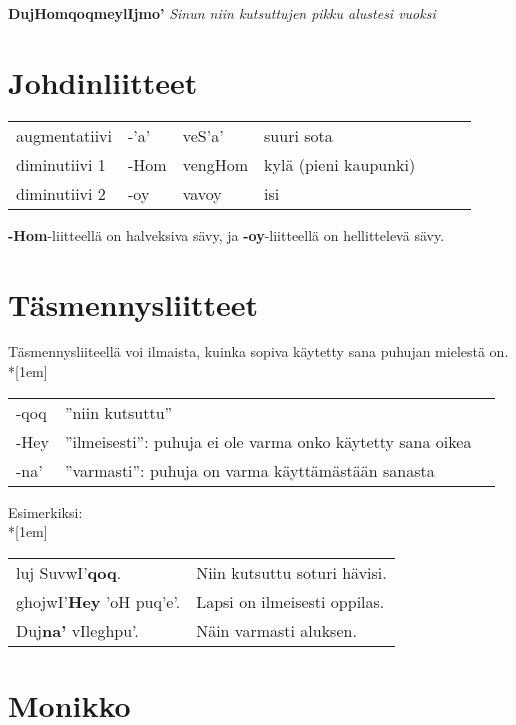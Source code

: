 \documentclass{book}
\begin{document}
\textbf{DujHomqoqmeylIjmo'} \textit{Sinun niin kutsuttujen pikku alustesi vuoksi}

\section{Johdinliitteet}

\begin{tabular}{l Bl | Bl Il}
    augmentatiivi & -'a' & veS'a' & suuri sota \\
    diminutiivi 1 & -Hom & vengHom & kylä (pieni kaupunki) \\
    diminutiivi 2 & -oy & vavoy & isi \\
\end{tabular}

\textbf{-Hom}-liitteellä on halveksiva sävy, ja \textbf{-oy}-liitteellä on hellittelevä sävy.

\section{Täsmennysliitteet}

Täsmennysliiteellä voi ilmaista, kuinka sopiva käytetty sana puhujan mielestä on.\\*[1em]
\begin{tabular}{Bl l}
    -qoq & ''niin kutsuttu'' \\
    -Hey & ''ilmeisesti'': puhuja ei ole varma onko käytetty sana oikea \\
    -na' & ''varmasti'': puhuja on varma käyttämästään sanasta \\
\end{tabular}

Esimerkiksi:\\*[1em]
\begin{tabular}{l l}
    luj SuvwI'\textbf{qoq}. & Niin kutsuttu soturi hävisi. \\
    ghojwI'\textbf{Hey} 'oH puq'e'. & Lapsi on ilmeisesti oppilas. \\
    Duj\textbf{na'} vIleghpu'. & Näin varmasti aluksen. \\
\end{tabular}

\section{Monikko}
\end{document}
